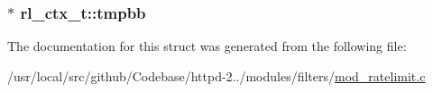 \subsubsection[{\texorpdfstring{tmpbb}{tmpbb}}]{$\ast$ rl\+\_\+ctx\+\_\+t\+::tmpbb}\hypertarget{structrl__ctx__t_adc299b40a5bb6e52403f946e277b1387}{}\label{structrl__ctx__t_adc299b40a5bb6e52403f946e277b1387}


The documentation for this struct was generated from the following file\+:\begin{DoxyCompactItemize}
\item 
/usr/local/src/github/\+Codebase/httpd-\/2../modules/filters/\hyperlink{mod__ratelimit_8c}{mod\+\_\+ratelimit.\+c}\end{DoxyCompactItemize}

